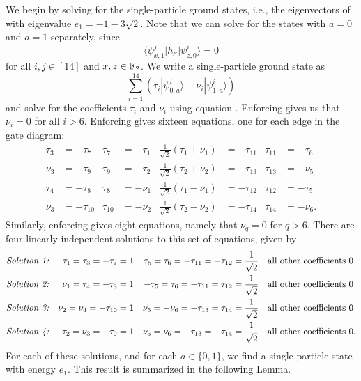 \documentclass[../thesis-main/thesis-main]{subfiles}
\begin{document}
We begin by solving for the single-particle ground states, i.e., the eigenvectors of  with eigenvalue $e_{1}=-1-3\sqrt{2}$.  Note that we can solve for the states with $a=0$ and $a=1$ separately, since
\begin{equation}
  \langle\psi_{x,1}^{j}|h_{\mathcal{E}}|\psi_{z,0}^{i}\rangle=0
\end{equation}
for all $i,j\in[14]$ and $x,z\in \mathbb{F}_2$. We write a single-particle ground state as
\begin{equation}
  \sum_{i=1}^{14}\left(\tau_{i}|\psi_{0,a}^{i}\rangle+\nu_{i}|\psi_{1,a}^{i}\rangle\right)
\end{equation}
and solve for the coefficients $\tau_{i}$ and $\nu_{i}$ using equation .  Enforcing  gives us that $\nu_i = 0$ for all $i>6$. Enforcing  gives sixteen equations, one for each edge in the gate diagram:
\begin{align}
  \tau_{3}&=-\tau_{7} & 
  \tau_{7}&= - \tau_{1}&
  \frac{1}{\sqrt{2}}(\tau_{1}+\nu_{1})&=-\tau_{11}&
  \tau_{11} &= -\tau_{6} \\
  \nu_{3} &= -\tau_{9}&
  \tau_{9} &= -\tau_{2} &
  \frac{1}{\sqrt{2}}(\tau_{2}+\nu_{2})&=-\tau_{13}&
  \tau_{13} &= - \nu_{5}\\
  \tau_{4}&=-\tau_{8} & 
  \tau_{8}&=-\nu_{1} &
  \frac{1}{\sqrt{2}}(\tau_{1}-\nu_{1})&=-\tau_{12} &
  \tau_{12} &= - \tau_{5}\\
  \nu_{3}&=-\tau_{10} & 
  \tau_{10} &= - \nu_{2} &
  \frac{1}{\sqrt{2}}(\tau_{2}-\nu_{2})&=-\tau_{14}&
  \tau_{14} &= - \nu_{6}  .
\end{align}
Similarly, enforcing  gives eight equations, namely that $\nu_q = 0$ for $q>6$.  There are four linearly independent solutions to this set of equations, given by 
\begin{align}
  \text{\emph{Solution 1:}} && 
    \tau_{1} = \tau_{3} = -\tau_{7} &=1 & 
    \tau_{5} =  \tau_{6} = -\tau_{11} = - \tau_{12} &=\frac{1}{\sqrt{2}} &&
    \text{all other coefficients }0 \\
  \text{\emph{Solution 2:}} && 
    \nu_{1} = \tau_{4} = -\tau_{8} &=1 &
    -\tau_{5} =  \tau_{6} = -\tau_{11} = \tau_{12} &= \frac{1}{\sqrt{2}} &&
    \text{all other coefficients }0 \\
  \text{\emph{Solution 3:}} && 
    \nu_{2} = \nu_{4} = -\tau_{10} &= 1 &
    \nu_{5} = -\nu_{6} = -\tau_{13} = \tau_{14} &= \frac{1}{\sqrt{2}} &&
    \text{all other coefficients }0 \\
  \text{\emph{Solution 4:}} && 
    \tau_{2} =  \nu_{3} = -\tau_{9} &= 1 &
    \nu_{5} =  \nu_{6} = -\tau_{13} = -\tau_{14} &=\frac{1}{\sqrt{2}} &&
    \text{all other coefficients }0.
\end{align}
For each of these solutions, and for each $a\in\{0,1\}$, we find a single-particle state with energy $e_1$. This result is summarized in the following Lemma.
\end{document}
